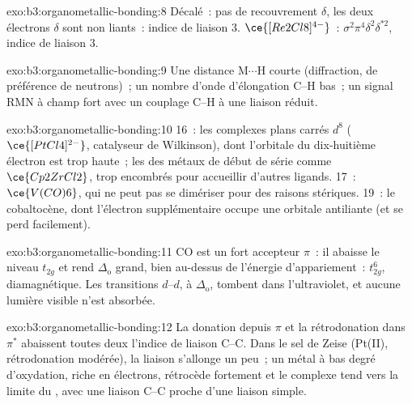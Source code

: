 \begin{solution}{exo:b3:organometallic-bonding:8}
Décalé~: pas de recouvrement $\delta$, les deux électrons $\delta$ sont non liants~: indice de liaison 3. $\ce{[Re2Cl8]^{4-}}$~:
$\sigma^2\pi^4\delta^2\delta^{\ast2}$, indice de liaison 3.
\end{solution}

\begin{solution}{exo:b3:organometallic-bonding:9}
Une distance M$\cdots$H courte (diffraction, de préférence de neutrons)~;
un nombre d'onde d'élongation C--H bas~; un signal RMN à champ fort avec un
couplage C--H à une liaison réduit.
\end{solution}

\begin{solution}{exo:b3:organometallic-bonding:10}
16~: les complexes plans carrés $d^8$ ($\ce{[PtCl4]^{2-}}$, catalyseur de Wilkinson), dont l'orbitale du dix-huitième électron
est trop haute~; les  des métaux de début de série comme $\ce{Cp2ZrCl2}$, trop encombrés pour
accueillir d'autres ligands. 17~: $\ce{V(CO)6}$, qui ne peut pas se dimériser pour des raisons stériques. 19~: le cobaltocène,
dont l'électron supplémentaire occupe une orbitale antiliante (et se perd
facilement).
\end{solution}

\begin{solution}{exo:b3:organometallic-bonding:11}
CO est un fort accepteur $\pi$~: il abaisse le niveau $t_{2g}$ et rend $\Delta_{\mathrm o}$ grand, bien au-dessus de
l'énergie d'appariement~: $t_{2g}^6$, diamagnétique. Les transitions $d$--$d$, à $\Delta_{\mathrm o}$, tombent dans l'ultraviolet,
et aucune lumière visible n'est absorbée.
\end{solution}

\begin{solution}{exo:b3:organometallic-bonding:12}
La donation depuis $\pi$ et la rétrodonation dans $\pi^*$ abaissent toutes deux l'indice de liaison C--C. Dans le sel
de Zeise (Pt(II), rétrodonation modérée), la liaison s'allonge un peu~; un
métal à bas degré d'oxydation, riche en électrons, rétrocède fortement et
le complexe tend vers la limite du , avec une liaison
C--C proche d'une liaison simple.
\end{solution}

